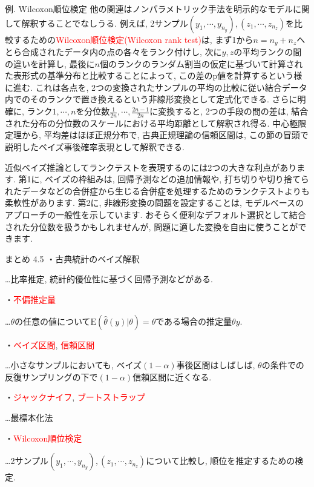 \documentclass[10pt,dvipdfmx,a4]{beamer}
\newcommand{\tcr}[1]{\textcolor{red}{#1}}
\begin{document}
\begin{frame}{例. Wilcoxon順位検定}
他の関連はノンパラメトリック手法を明示的なモデルに関して解釈することでなしうる.
例えば, 2サンプル$(y_1,\cdots,y_{n_y}), (z_1,\cdots,z_{n_z})$を比較するための\tcr{Wilcoxon順位検定(Wilcoxon rank test)}は, まず1から$n=n_y+n_z$へとら合成されたデータ内の点の各々をランク付けし, 次に$y, z$の平均ランクの間の違いを計算し, 最後に$n$個のランクのランダム割当の仮定に基づいて計算された表形式の基準分布と比較することによって, この差のp値を計算するという様に進む.
これは各点を, 2つの変換されたサンプルの平均の比較に従い結合データ内でのそのランクで置き換えるという非線形変換として定式化できる.
さらに明確に, ランク$1, \cdots, n$を分位数$\tfrac{1}{2n},\cdots,\tfrac{2n-1}{2n}$に変換すると, 2つの手段の間の差は, 結合された分布の分位数のスケールにおける平均距離として解釈され得る.
中心極限定理から, 平均差はほぼ正規分布で, 古典正規理論の信頼区間は, この節の冒頭で説明したベイズ事後確率表現として解釈できる.
\end{frame}


\begin{frame}
近似ベイズ推論としてランクテストを表現するのには2つの大きな利点があります.
第1に, ベイズの枠組みは, 回帰予測などの追加情報や, 打ち切りや切り捨てられたデータなどの合併症から生じる合併症を処理するためのランクテストよりも柔軟性があります.
第2に, 非線形変換の問題を設定することは, モデルベースのアプローチの一般性を示しています.
おそらく便利なデフォルト選択として結合された分位数を扱うかもしれませんが, 問題に適した変換を自由に使うことができます.
\end{frame}


\begin{frame}{まとめ 4.5}
・古典統計のベイズ解釈

…比率推定, 統計的優位性に基づく回帰予測などがある.

・\tcr{不偏推定量}

…$\theta$の任意の値について$\text{E}(\hat{\theta}(y)|\theta)=\theta$である場合の推定量$\theta y$.

・\tcr{ベイズ区間}, \tcr{信頼区間}

…小さなサンプルにおいても, ベイズ$(1-\alpha)$事後区間はしばしば, $\theta$の条件での反復サンプリングの下で$(1-\alpha)$信頼区間に近くなる.

・\tcr{ジャックナイフ}, \tcr{ブートストラップ}

…最標本化法

・\tcr{Wilcoxon順位検定}

…2サンプル$(y_1,\cdots,y_{n_y}), (z_1,\cdots,z_{n_z})$について比較し, 順位を推定するための検定.
\end{frame}

\end{document}
